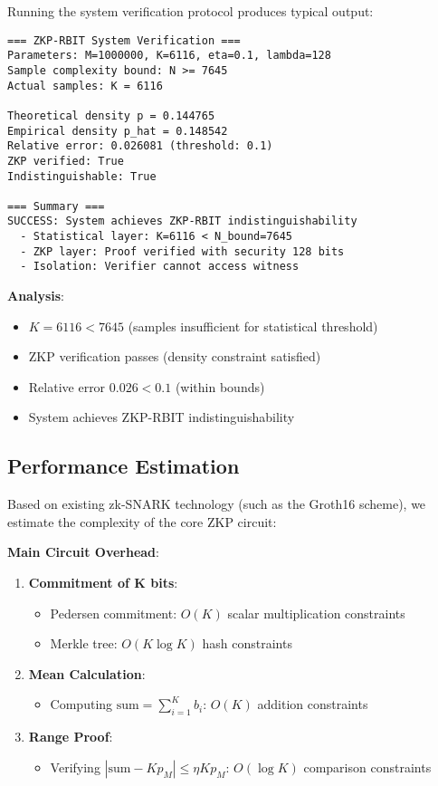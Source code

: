 \documentclass[12pt]{article}
\theoremstyle{plain}
\theoremstyle{definition}
\begin{document}
Running the system verification protocol produces typical output:

\begin{verbatim}
=== ZKP-RBIT System Verification ===
Parameters: M=1000000, K=6116, eta=0.1, lambda=128
Sample complexity bound: N >= 7645
Actual samples: K = 6116

Theoretical density p = 0.144765
Empirical density p_hat = 0.148542
Relative error: 0.026081 (threshold: 0.1)
ZKP verified: True
Indistinguishable: True

=== Summary ===
SUCCESS: System achieves ZKP-RBIT indistinguishability
  - Statistical layer: K=6116 < N_bound=7645
  - ZKP layer: Proof verified with security 128 bits
  - Isolation: Verifier cannot access witness
\end{verbatim}

\textbf{Analysis}:
\begin{itemize}
\item $K = 6116 < 7645$ (samples insufficient for statistical threshold)
\item ZKP verification passes (density constraint satisfied)
\item Relative error $0.026 < 0.1$ (within bounds)
\item System achieves ZKP-RBIT indistinguishability
\end{itemize}

\subsection{Performance Estimation}

Based on existing zk-SNARK technology (such as the Groth16 scheme), we estimate the complexity of the core ZKP circuit:

\textbf{Main Circuit Overhead}:

\begin{enumerate}
\item \textbf{Commitment of K bits}:
\begin{itemize}
   \item Pedersen commitment: $O(K)$ scalar multiplication constraints
   \item Merkle tree: $O(K \log K)$ hash constraints
\end{itemize}

\item \textbf{Mean Calculation}:
\begin{itemize}
   \item Computing $\text{sum} = \sum_{i=1}^K b_i$: $O(K)$ addition constraints
\end{itemize}

\item \textbf{Range Proof}:
\begin{itemize}
   \item Verifying $|\text{sum} - Kp_M| \le \eta Kp_M$: $O(\log K)$ comparison constraints
\end{itemize}
\end{enumerate}
\end{document}
